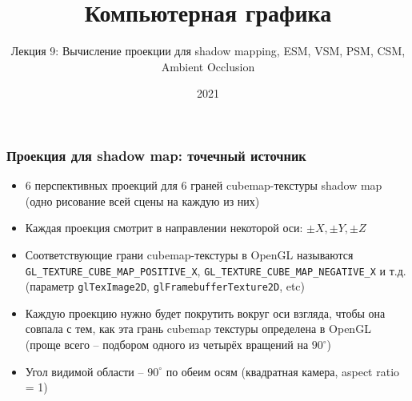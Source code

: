 \documentclass{beamer}
\title{Компьютерная графика}
\subtitle{Лекция 9: Вычисление проекции для shadow mapping, ESM, VSM, PSM, CSM, Ambient Occlusion}
\date{2021}
\begin{document}
\frame{\titlepage}

\begin{frame}[fragile]
\frametitle{Проекция для shadow map: точечный источник}
\begin{itemize}
\item 6 перспективных проекций для 6 граней cubemap-текстуры shadow map (одно рисование всей сцены на каждую из них)
\pause
\item Каждая проекция смотрит в направлении некоторой оси: \begin{math}\pm X, \pm Y, \pm Z\end{math}
\pause
\item Соответствующие грани cubemap-текстуры в OpenGL называются \verb|GL_TEXTURE_CUBE_MAP_POSITIVE_X|, \verb|GL_TEXTURE_CUBE_MAP_NEGATIVE_X| и т.д. (параметр \verb|glTexImage2D|, \verb|glFramebufferTexture2D|, etc)
\pause
\item Каждую проекцию нужно будет покрутить вокруг оси взгляда, чтобы она совпала с тем, как эта грань cubemap текстуры определена в OpenGL (проще всего -- подбором одного из четырёх вращений на \begin{math}90^\circ\end{math})
\pause
\item Угол видимой области -- \begin{math}90^\circ\end{math} по обеим осям (квадратная камера, aspect ratio = 1)
\end{itemize}
\end{frame}
\end{document}
